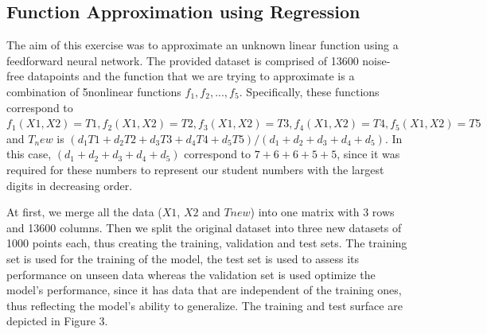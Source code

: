 \documentclass[11pt,conference,compsoc]{IEEEtran}
\begin{document}
\subsection{Function Approximation using Regression}
The aim of this exercise was to approximate an unknown linear function using a feedforward neural network. The provided dataset is comprised of 13600 noise-free datapoints and the function that we are trying to approximate is a combination of 5nonlinear functions $f_1,f_2,...,f_5$. Specifically, these functions correspond to $f_1(X1,X2) = T1, f_2(X1, X2) = T2, f_3(X1, X2) = T3, f_4(X1, X2) = T4,  f_5(X1, X2) = T5$ and $T_new$ is $(d_1T1 + d_2T2 + d_3T3 + d_4T4 + d_5T5) / (d_1 + d_2 + d_3 + d_4 + d_5)$. In this case, $(d_1 + d_2 + d_3 + d_4 + d_5)$ correspond to $7 + 6 + 6 + 5 + 5$, since it was required for these numbers to represent our student numbers with the largest digits in decreasing order. 

At first, we merge all the data ($X1$, $X2$ and $Tnew$) into one matrix with 3 rows and 13600 columns. Then we split the original dataset into three new datasets of 1000 points each, thus creating the training, validation and test sets. The training set is used for the training of the model, the test set is used to assess its performance on unseen data whereas the validation set is used optimize the model's performance, since it has data that are independent of the training ones, thus reflecting the model's ability to generalize. The training and test surface are depicted in Figure 3.
\end{document}
